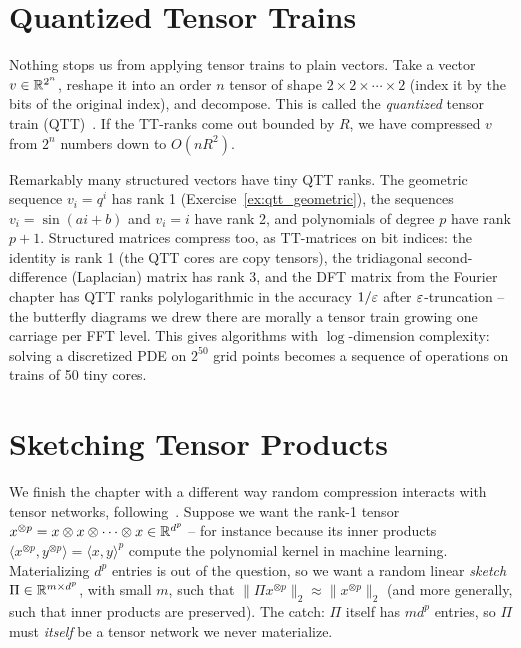 \section{Quantized Tensor Trains}

Nothing stops us from applying tensor trains to plain vectors.
Take a vector $v \in \mathbb R^{2^n}$, reshape it into an order $n$ tensor of shape $2 \times 2 \times \cdots \times 2$ (index it by the bits of the original index), and decompose.
This is called the \emph{quantized} tensor train (QTT)~\cite{oseledets_qtt}.
If the TT-ranks come out bounded by $R$, we have compressed $v$ from $2^n$ numbers down to $O(n R^2)$.

Remarkably many structured vectors have tiny QTT ranks.
The geometric sequence $v_i = q^i$ has rank 1
(Exercise~\ref{ex:qtt_geometric}),
the sequences $v_i = \sin(a i + b)$ and $v_i = i$ have rank 2,
and polynomials of degree $p$ have rank $p+1$.
Structured matrices compress too, as TT-matrices on bit indices:
the identity is rank 1 (the QTT cores are copy tensors),
the tridiagonal second-difference (Laplacian) matrix has rank 3,
and the DFT matrix from the Fourier chapter has QTT ranks polylogarithmic in the accuracy $1/\varepsilon$ after $\varepsilon$-truncation -- the butterfly diagrams we drew there are morally a tensor train growing one carriage per FFT level.
This gives algorithms with $\log$-dimension complexity: solving a discretized PDE on $2^{50}$ grid points becomes a sequence of operations on trains of 50 tiny cores.

\section{Sketching Tensor Products}
\label{sec:tt_sketching}

We finish the chapter with a different way random compression interacts with tensor networks,
following~\cite{ahle_sketching}.
Suppose we want the rank-1 tensor
$x^{\otimes p} = x \otimes x \otimes \cdots \otimes x \in \mathbb R^{d^p}$
-- for instance because its inner products
$\langle x^{\otimes p}, y^{\otimes p}\rangle = \langle x, y\rangle^p$
compute the polynomial kernel in machine learning.
Materializing $d^p$ entries is out of the question,
so we want a random linear \emph{sketch} $\Pi \in \mathbb R^{m \times d^p}$, with small $m$, such that
$\|\Pi x^{\otimes p}\|_2 \approx \|x^{\otimes p}\|_2$
(and more generally, such that inner products are preserved).
The catch: $\Pi$ itself has $m d^p$ entries,
so $\Pi$ must \emph{itself} be a tensor network we never materialize.

